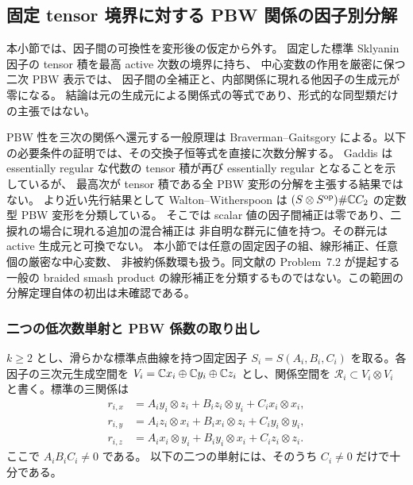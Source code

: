 \subsection{固定 tensor 境界に対する PBW 関係の因子別分解}
\label{ifp:subsec:factorization}

本小節では、因子間の可換性を変形後の仮定から外す。
固定した標準 Sklyanin 因子の tensor 積を最高 active 次数の境界に持ち、
中心変数の作用を厳密に保つ二次 PBW 表示では、
因子間の全補正と、内部関係に現れる他因子の生成元が零になる。
結論は元の生成元による関係式の等式であり、形式的な同型類だけの主張ではない。

PBW 性を三次の関係へ還元する一般原理は
Braverman--Gaitsgory \cite[Main Theorem~0.5, Lemma~3.3]{CMOBravermanGaitsgory}
による。以下の必要条件の証明では、その交換子恒等式を直接に次数分解する。
Gaddis \cite[Proposition~5.1]{CMOGaddisPBW} は essentially regular な代数の
tensor 積が再び essentially regular となることを示しているが、
最高次が tensor 積である全 PBW 変形の分解を主張する結果ではない。
より近い先行結果として Walton--Witherspoon
\cite[Hypothesis~2.6, Proposition~6.2]{CMOWaltonWitherspoonBraided} は
$(S\otimes S^{\mathrm{op}})\#\mathbb C C_2$ の定数型 PBW 変形を分類している。
そこでは scalar 値の因子間補正は零であり、二捩れの場合に現れる追加の混合補正は
非自明な群元に値を持つ。その群元は active 生成元と可換でない。
本小節では任意の固定因子の組、線形補正、任意個の厳密な中心変数、
非被約係数環も扱う。同文献の Problem~7.2 が提起する一般の braided smash product
の線形補正を分類するものではない。この範囲の分解定理自体の初出は未確認である。

\subsubsection{二つの低次数単射と PBW 係数の取り出し}

$k\ge2$ とし、滑らかな標準点曲線を持つ固定因子
$S_i=S(A_i,B_i,C_i)$ を取る。各因子の三次元生成空間を
$V_i=\mathbb C x_i\oplus\mathbb C y_i\oplus\mathbb C z_i$ とし、関係空間を
$\mathcal R_i\subset V_i\otimes V_i$ と書く。標準の三関係は
\begin{equation}\label{ifp:eq:sklyanin-relations}
\begin{aligned}
 r_{i,x}&=A_i y_i\otimes z_i+B_i z_i\otimes y_i+C_i x_i\otimes x_i,\\
 r_{i,y}&=A_i z_i\otimes x_i+B_i x_i\otimes z_i+C_i y_i\otimes y_i,\\
 r_{i,z}&=A_i x_i\otimes y_i+B_i y_i\otimes x_i+C_i z_i\otimes z_i.
\end{aligned}
\end{equation}
ここで $A_iB_iC_i\ne0$ である。
以下の二つの単射には、そのうち $C_i\ne0$ だけで十分である。

